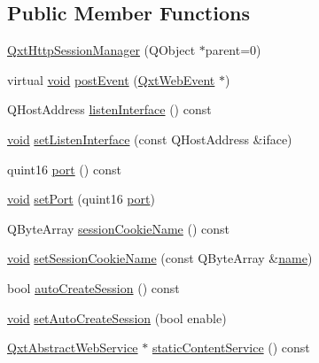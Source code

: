\subsection*{Public Member Functions}
\begin{DoxyCompactItemize}
\item 
\hyperlink{class_qxt_http_session_manager_af373aadbd465f9cd67f082896cbe0434}{Qxt\-Http\-Session\-Manager} (Q\-Object $\ast$parent=0)
\item 
virtual \hyperlink{group___u_a_v_objects_plugin_ga444cf2ff3f0ecbe028adce838d373f5c}{void} \hyperlink{class_qxt_http_session_manager_a47be06e6ea47d6436ec51f93face1aef}{post\-Event} (\hyperlink{class_qxt_web_event}{Qxt\-Web\-Event} $\ast$)
\item 
Q\-Host\-Address \hyperlink{class_qxt_http_session_manager_a4a9aef668ca865f93a205a6a9d9ea3d7}{listen\-Interface} () const 
\item 
\hyperlink{group___u_a_v_objects_plugin_ga444cf2ff3f0ecbe028adce838d373f5c}{void} \hyperlink{class_qxt_http_session_manager_a14cedbca64308c161836b9df5989a070}{set\-Listen\-Interface} (const Q\-Host\-Address \&iface)
\item 
quint16 \hyperlink{class_qxt_http_session_manager_a21e74646ca644ac633a49ff8b10f10a4}{port} () const 
\item 
\hyperlink{group___u_a_v_objects_plugin_ga444cf2ff3f0ecbe028adce838d373f5c}{void} \hyperlink{class_qxt_http_session_manager_a6493c537ab1f5c17d1dee38239c226ef}{set\-Port} (quint16 \hyperlink{classport}{port})
\item 
Q\-Byte\-Array \hyperlink{class_qxt_http_session_manager_a4e796d3c34faeb8095e735a46c21d77a}{session\-Cookie\-Name} () const 
\item 
\hyperlink{group___u_a_v_objects_plugin_ga444cf2ff3f0ecbe028adce838d373f5c}{void} \hyperlink{class_qxt_http_session_manager_a7151bc280725d5b8e1dc8719217cbab1}{set\-Session\-Cookie\-Name} (const Q\-Byte\-Array \&\hyperlink{glext_8h_ad977737dfc9a274a62741b9500c49a32}{name})
\item 
bool \hyperlink{class_qxt_http_session_manager_a7a684af0adc9612b10d92806c090d31e}{auto\-Create\-Session} () const 
\item 
\hyperlink{group___u_a_v_objects_plugin_ga444cf2ff3f0ecbe028adce838d373f5c}{void} \hyperlink{class_qxt_http_session_manager_aac59da27448b44f30c9956fd56fb9ad9}{set\-Auto\-Create\-Session} (bool enable)
\item 
\hyperlink{class_qxt_abstract_web_service}{Qxt\-Abstract\-Web\-Service} $\ast$ \hyperlink{class_qxt_http_session_manager_ab79d2b8a0c7e89fd869799e6382f6d17}{static\-Content\-Service} () const 

\end{DoxyCompactItemize}

